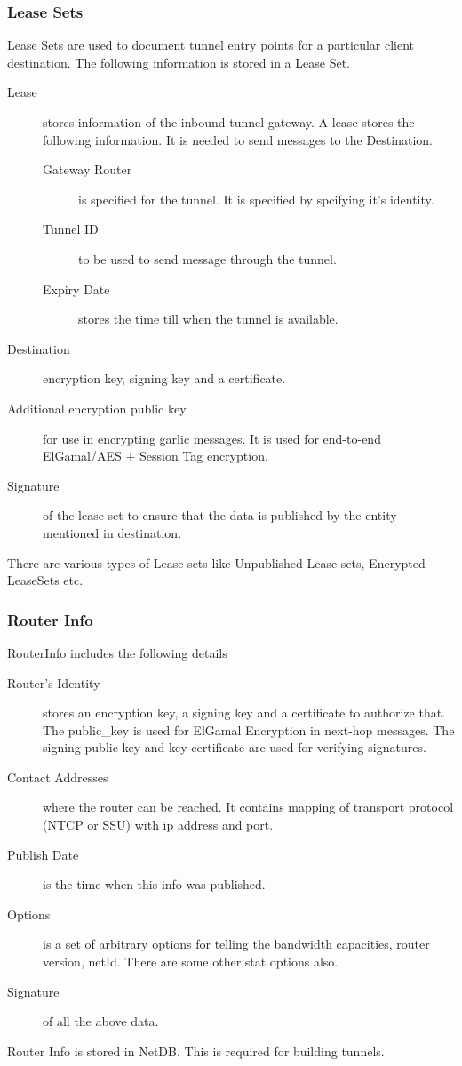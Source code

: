 \documentclass{main}
\begin{document}
\subsubsection{Lease Sets}
\label{subsec:leaseSet}
Lease Sets are used to document tunnel entry points for a particular client destination. The following information is
stored in a Lease Set.
\begin{description}
	\item [Lease] stores information of the inbound tunnel gateway. A lease
		stores the following information. It is needed to send messages to the Destination.
		\begin{description}
			\item [Gateway Router] is specified for the tunnel. It is specified by spcifying it's identity.
			\item [Tunnel ID] to be used to send message through the tunnel.
			\item [Expiry Date] stores the time till when the tunnel is available.
		\end{description}
	\item [Destination] encryption key, signing key and a certificate.
	\item [Additional encryption public key] for use in encrypting garlic messages. It is used for end-to-end 
		ElGamal/AES + Session Tag encryption.
	\item [Signature] of the lease set to ensure that the data is published by the entity mentioned
		in destination.
\end{description}
There are various types of Lease sets like Unpublished Lease sets, Encrypted LeaseSets etc.

\subsubsection{Router Info}
\label{subsec:routerInfo}
RouterInfo includes the following details
\begin{description}
	\item [Router's Identity] stores an encryption key, a signing key and a certificate to authorize that.
		The public\_key is used for ElGamal Encryption in next-hop messages. The signing public key and
		key certificate are used for verifying signatures.
	\item [Contact Addresses] where the router can be reached. It contains mapping of transport protocol (NTCP or SSU)
		with ip address and port. 
	\item [Publish Date] is the time when this info was published.
	\item [Options] is a set of arbitrary options for telling the bandwidth capacities, router version, netId. There
		are some other stat options also.
	\item [Signature] of all the above data.
\end{description}
Router Info is stored in NetDB. This is required for building tunnels.
\end{document}
